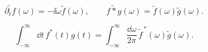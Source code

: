 
\begin{equation}
{
\widetilde{\partial_t f}(\omega)=-\ii\omega\widetilde f(\omega),
\qquad
\widetilde{f*g}(\omega)=\widetilde f(\omega)\widetilde g(\omega).}
\label{eq:fourier-derivative-convolution-dp21}
\end{equation}

\begin{equation}
{
\int_{-\infty}^{\infty}\dd t\,f^*(t)g(t)
=\int_{-\infty}^{\infty}\frac{\dd\omega}{2\pi}\,
\widetilde f^{\,*}(\omega)\widetilde g(\omega).}
\label{eq:parseval-time-dp21}
\end{equation}

